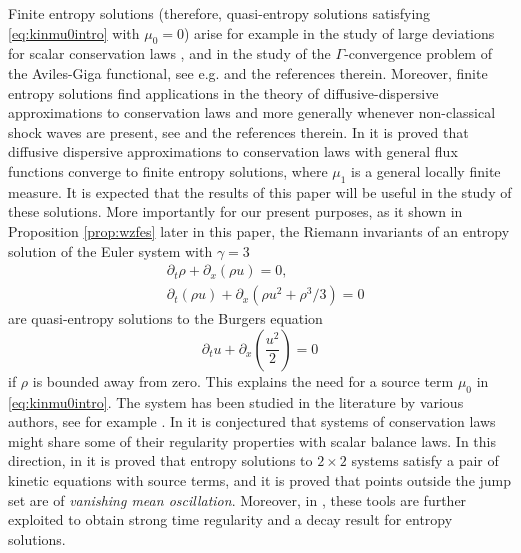 \documentclass[11pt, twoside, reqno]{amsart}
\theoremstyle{definition}
\theoremstyle{remark}
\numberwithin{equation}{section}
\begin{document}
Finite entropy solutions (therefore, quasi-entropy solutions satisfying \eqref{eq:kinmu0intro} with $\mu_0 = 0$) arise for example in the study of large deviations for scalar conservation laws \cite{bertini_al}, \cite{Mariani_large} and in the study of the $\Gamma$-convergence problem of the Aviles-Giga functional, see e.g. \cite{marconi_aviles} and the references therein. Moreover, finite entropy solutions find applications in the theory of diffusive-dispersive approximations to conservation laws and more generally whenever non-classical shock waves are present, see \cite{LeFloch2002} and the references therein.
 In \cite{HT02}   it is proved that diffusive dispersive approximations to conservation laws with general flux functions converge to finite entropy solutions, where $\mu_1$ is a general locally finite measure. It is expected that the results of this paper will be useful in the study of these solutions. More importantly for our present purposes, as it shown in Proposition \ref{prop:wzfes} later in this paper, the Riemann invariants of an entropy solution of the Euler system with $\gamma = 3$ 
\begin{equation}\label{eq:isointro}
\begin{aligned}
    & \partial_t \rho + \partial_x (\rho u) = 0, \\
    & \partial_t (\rho u)  + \partial_x (\rho u^2 + \rho^3/3) = 0
    \end{aligned}
\end{equation}
are quasi-entropy solutions to the Burgers equation
\begin{equation}\label{eq:burintro}
    \partial_t u + \partial_x \left( \frac{u^2}{2}\right) = 0
\end{equation}
if $\rho$ is bounded away from zero. This explains the need for a source term $\mu_0$ in \eqref{eq:kinmu0intro}. The system has been studied in the literature by various authors, see for example \cite{Gol23,LPT_kineticise, vasseur_gamma3,  Vas99}. In \cite{ABBCN} it is conjectured that systems of conservation laws might share some of their regularity properties with scalar balance laws. In this direction, in \cite{AMT25} it is proved that entropy solutions to $2\times 2$ systems satisfy a pair of kinetic equations with source terms, and it is proved that points outside the jump set are of \emph{vanishing mean oscillation}. Moreover, in \cite{Tal25}, these tools are further exploited to obtain strong time regularity and a decay result for entropy solutions. 
\end{document}

